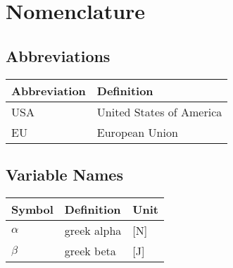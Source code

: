 \chapter*{Nomenclature}


\section*{Abbreviations}

\begin{longtable}{p{2.5cm}p{8cm}}
    \toprule
    Abbreviation & Definition \\
    \midrule\endhead %
    USA & United States of America\\
    EU & European Union \\
      \bottomrule
\end{longtable}

\section*{Variable Names}

\begin{longtable}{p{2.5cm}p{8cm}p{2.5cm}}
    \toprule
    Symbol & Definition & Unit \\
    \midrule\endhead %
    $\alpha$ & greek alpha & [\si{\newton}] \\
    \midrule
    $\beta$  & greek beta  & [\si{\joule}]   \\
    \bottomrule
\end{longtable}
